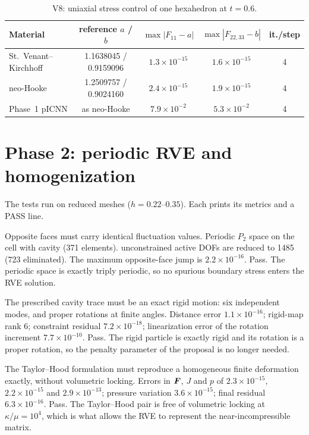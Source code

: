 \begin{table}[H]
\centering\small
\caption{V8: uniaxial stress control of one hexahedron at $t=0.6$.}
\label{tab:v8}
\setlength{\tabcolsep}{4pt}
\begin{tabular}{@{}lcccc@{}}
\toprule
Material & reference $a$ / $b$ & $\max|F_{11}-a|$ & $\max|F_{22,33}-b|$ & it./step\\
\midrule
St.\ Venant--Kirchhoff & 1.1638045 / 0.9159096 & $1.3\times10^{-15}$ & $1.6\times10^{-15}$ & 4\\
neo-Hooke & 1.2509757 / 0.9024160 & $2.4\times10^{-15}$ & $1.9\times10^{-15}$ & 4\\
Phase~1 pICNN & as neo-Hooke & $7.9\times10^{-2}$ & $5.3\times10^{-2}$ & 4\\
\bottomrule
\end{tabular}
\end{table}

\section{Phase 2: periodic RVE and homogenization}

The tests run on reduced meshes ($h=0.22$--$0.35$). Each prints its metrics and a
PASS line.

\taim Opposite faces must carry identical fluctuation values.
\tsetup Periodic $P_2$ space on the cell with cavity (371 elements).
\trun {}
 unconstrained active DOFs are reduced to 1485 (723 eliminated). The
maximum opposite-face jump is $2.2\times10^{-16}$. Pass.
\tinfer The periodic space is exactly triply periodic, so no spurious boundary stress enters the RVE solution.

\taim The prescribed cavity trace must be an exact rigid motion: six independent
modes, and proper rotations at finite angles.
\trun {}
\tobtain Distance error $1.1\times10^{-16}$; rigid-map rank 6; constraint residual
$7.2\times10^{-18}$; linearization error of the rotation increment
$7.7\times10^{-10}$. Pass.
\tinfer The rigid particle is exactly rigid and its rotation is a proper rotation, so the penalty parameter of the proposal is no longer needed.

\taim The Taylor--Hood formulation must reproduce a homogeneous finite deformation
exactly, without volumetric locking.
\trun {}
\tobtain Errors in $\bm F$, $J$ and $p$ of $2.3\times10^{-15}$, $2.2\times10^{-15}$ and
$2.9\times10^{-13}$; pressure variation $3.6\times10^{-15}$; final residual
$6.3\times10^{-16}$. Pass.
\tinfer The Taylor--Hood pair is free of volumetric locking at $\kappa/\mu=10^4$, which is what allows the RVE to represent the near-incompressible matrix.

